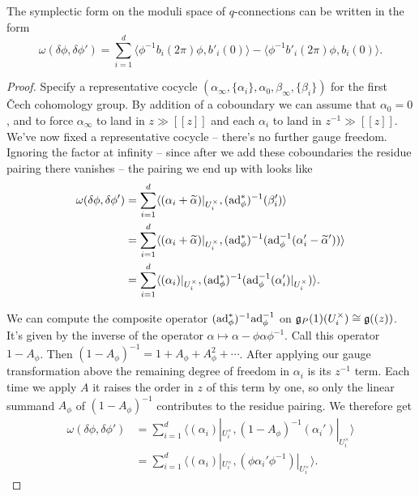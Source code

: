 \documentclass[10pt, oneside]{article}
\begin{document}
\begin{prop} \label{qconn_symp_description}
The symplectic form on the moduli space of $q$-connections can be written in the form
\[\omega(\delta \phi, \delta \phi') = \sum_{i=1}^d \langle \phi^{-1} b_i(2\pi) \phi, b'_i(0) \rangle - \langle \phi^{-1} b'_i(2\pi) \phi, b_i(0) \rangle.\]
\end{prop}

\begin{proof}
 Specify a representative cocycle $(\alpha_\infty, \{\alpha_i\}, \alpha_0, \beta_\infty, \{\beta_i\})$ for the first \v Cech cohomology group. By addition of a coboundary we can assume that $\alpha_0=0$, and to force $\alpha_\infty$ to land in $z\gg[[z]]$ and each $\alpha_i$ to land in $z^{-1}\gg[[z]]$.  We've now fixed a representative cocycle -- there's no further gauge freedom.  Ignoring the factor at infinity -- since after we add these coboundaries the residue pairing there vanishes -- the pairing we end up with looks like 
\begin{align*}
\omega(\delta \phi, \delta \phi') &= \sum_{i=1}^d \langle (\alpha_i + \widetilde{\alpha})|_{U^\times_i}, (\mathrm{ad}_\phi^*)^{-1}( \beta'_i) \rangle \\ 
&= \sum_{i=1}^d \langle (\alpha_i + \widetilde{\alpha})|_{U^\times_i}, (\mathrm{ad}_\phi^*)^{-1}(\mathrm{ad}_\phi^{-1}(\alpha_i' - \widetilde{\alpha}')) \rangle \\
&= \sum_{i=1}^d \langle (\alpha_i)|_{U^\times_i}, (\mathrm{ad}_\phi^*)^{-1}(\mathrm{ad}_\phi^{-1}(\alpha_i')|_{U^\times_i}) \rangle.
\end{align*}

We can compute the composite operator $(\mathrm{ad}_\phi^*)^{-1}\mathrm{ad}_\phi^{-1}$ on $\mathfrak{g}_P(1)(U^\times_i) \cong \mathfrak{g}((z))$.  It's given by the inverse of the operator $\alpha \mapsto \alpha - \phi \alpha \phi^{-1}$.  Call this operator $1 - A_\phi$.  Then $(1-A_\phi)^{-1} = 1 + A_\phi + A_\phi^2 + \cdots$.  After applying our gauge transformation above the remaining degree of freedom in $\alpha_i$ is its $z^{-1}$ term.  Each time we apply $A$ it raises the order in $z$ of this term by one, so only the linear summand $A_\phi$ of $(1-A_\phi)^{-1}$ contributes to the residue pairing.  We therefore get
\begin{align*}
\omega(\delta \phi, \delta \phi') &= \sum_{i=1}^d \langle (\alpha_i)|_{U^\times_i}, (1-A_\phi)^{-1}(\alpha_i')|_{U^\times_i} \rangle\\
&= \sum_{i=1}^d \langle (\alpha_i)|_{U^\times_i}, (\phi \alpha_i' \phi^{-1})|_{U^\times_i}\rangle.
\end{align*}


\end{proof}
\end{document}
